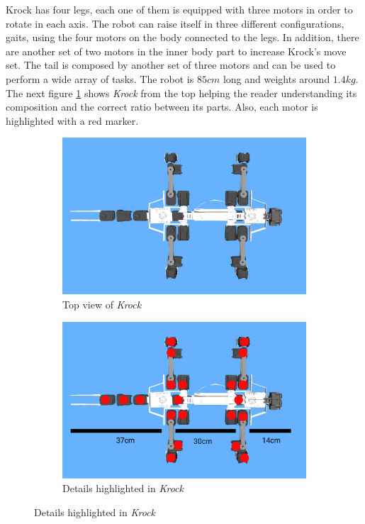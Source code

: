 \documentclass[../document.tex]{subfiles}
\begin{document}
Krock has four legs, each one of them is equipped with three motors in order to rotate in each axis. The robot can raise itself in three different configurations, gaits, using the four motors on the body connected to the legs. In addition, there are another set of two motors in the inner body part to increase Krock's move set. 
The tail is composed by another set of three motors and can be used to perform a wide array of tasks.
The robot is $85cm$ long and weights around $1.4kg$. The next figure \ref{fig:krock-top} shows \emph{Krock} from the top helping the reader understanding its composition and the correct ratio between its parts. Also, each motor is highlighted with a red marker.
\begin{figure}[htbp]
\centering
     \begin{subfigure}[b]{0.49\textwidth}
    \includegraphics[width=\textwidth]{../img/krock-top.jpg}
    \caption{Top view of \emph{Krock}}
   	\end{subfigure}
     \begin{subfigure}[b]{0.49\textwidth}
      \includegraphics[width=\textwidth]{../img/krock-top-highlight.png}
    \caption{Details highlighted in \emph{Krock}}
   	\end{subfigure}
   	    \label{fig:krock-top}

\end{figure}
\end{document}
